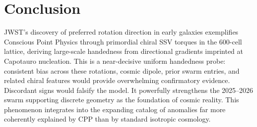 \documentclass[11pt]{article}
\begin{document}
\section{Conclusion}
JWST's discovery of preferred rotation direction in early galaxies exemplifies Conscious Point Physics through primordial chiral SSV torques in the 600-cell lattice, deriving large-scale handedness from directional gradients imprinted at Capotauro nucleation.  
This is a near-decisive uniform handedness probe: consistent bias across these rotations, cosmic dipole, prior swarm entries, and related chiral features would provide overwhelming confirmatory evidence. Discordant signs would falsify the model. It powerfully strengthens the 2025--2026 swarm supporting discrete geometry as the foundation of cosmic reality.  
This phenomenon integrates into the expanding catalog of anomalies far more coherently explained by CPP than by standard isotropic cosmology.
\end{document}
